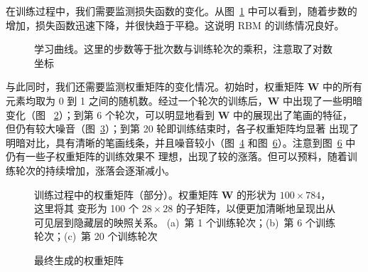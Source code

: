 在训练过程中，我们需要监测损失函数的变化。从图~\ref{fig:learning-curve} 中可以看到，随着步数的
增加，损失函数迅速下降，并很快趋于平稳。这说明 RBM 的训练情况良好。

\begin{figure}[htb]
  \centering
  \caption{学习曲线。这里的步数等于批次数与训练轮次的乘积，注意取了对数坐标}
  \label{fig:learning-curve}
\end{figure}

与此同时，我们还需要监测权重矩阵的变化情况。初始时，权重矩阵 $\bm{W}$ 中的所有元素均取为 0 到 1
之间的随机数。经过一个轮次的训练后，$\bm{W}$ 中出现了一些明暗变化（图~%
\ref{fig:mnist-weight-epoch-a}）；到第 6 个轮次，可以明显地看到 $\bm{W}$ 中的展现出了笔画的特征，
但仍有较大噪音（图~\ref{fig:mnist-weight-epoch-b}）；到第 20 轮即训练结束时，各子权重矩阵均显著
出现了明暗对比，具有清晰的笔画线条，并且噪音较小（图~\ref{fig:mnist-weight-epoch-c}
和图~\ref{fig:mnist-weight}）。注意到图~\ref{fig:mnist-weight} 中仍有一些子权重矩阵的训练效果不
理想，出现了较的涨落。但可以预料，随着训练轮次的持续增加，涨落会逐渐减小。

\begin{figure}[htb]
  \centering
  \begin{subfigure}[b]{0.3\textwidth}
    \centering
    \caption{}
    \label{fig:mnist-weight-epoch-a}
  \end{subfigure}
  \begin{subfigure}[b]{0.3\textwidth}
    \centering
    \caption{}
    \label{fig:mnist-weight-epoch-b}
  \end{subfigure}
  \begin{subfigure}[b]{0.3\textwidth}
    \centering
    \caption{}
    \label{fig:mnist-weight-epoch-c}
  \end{subfigure}
  \caption{训练过程中的权重矩阵（部分）。权重矩阵 $\bm{W}$ 的形状为 $100 \times 784$，这里将其
    变形为 100 个 $28 \times 28$ 的子矩阵，以便更加清晰地呈现出从可见层到隐藏层的映照关系。
    (a)~第 1 个训练轮次；(b)~第 6 个训练轮次；(c)~第 20 个训练轮次}
  \label{fig:mnist-weight-epoch}
\end{figure}

\begin{figure}[htb]
  \centering
  \caption{最终生成的权重矩阵}
  \label{fig:mnist-weight}
\end{figure}

